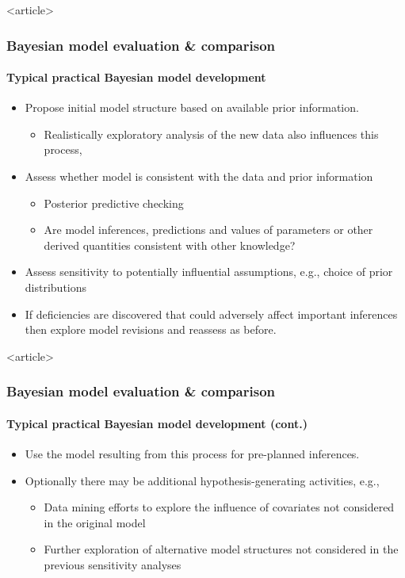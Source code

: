 \documentclass[handout]{beamer}
\begin{document}
\begin{frame}<article>
  \frametitle{Bayesian model evaluation \& comparison}
  \framesubtitle{\large Typical practical Bayesian model development}

  \begin{itemize}
  \item Propose initial model structure based on available prior
    information.
    \begin{itemize}
    \item Realistically exploratory analysis of the new data also
      influences this process,
    \end{itemize}
  \item Assess whether model is consistent with the data and prior
    information
    \begin{itemize}
    \item Posterior predictive checking
    \item Are model inferences, predictions and values of parameters
      or other derived quantities consistent with other knowledge?
    \end{itemize}
  \item Assess sensitivity to potentially influential assumptions,
    e.g., choice of prior distributions
  \item If deficiencies are discovered that could adversely affect
    important inferences then explore model revisions and reassess as
    before.
  \end{itemize}

\end{frame}

\begin{frame}<article>
  \frametitle{Bayesian model evaluation \& comparison}
  \framesubtitle{\large Typical practical Bayesian model development
    (cont.)}

  \begin{itemize}
  \item Use the model resulting from this process for pre-planned
    inferences.
  \item Optionally there may be additional hypothesis-generating
    activities, e.g.,
    \begin{itemize}
    \item Data mining efforts to explore the influence of covariates
      not considered in the original model
    \item Further exploration of alternative model structures not
      considered in the previous sensitivity analyses
    \end{itemize}
  \end{itemize}

\end{frame}
\end{document}
